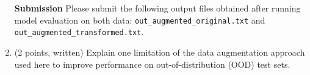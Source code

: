\documentclass{article}
\theoremstyle{case}
\theoremstyle{definition}
\begin{document}
\begin{enumerate}
    \textbf{Submission} Please submit the following output files obtained after running model evaluation on both data: \texttt{out\_augmented\_original.txt} and  \texttt{out\_augmented\_transformed.txt}.



    \newpage
    \item (2 points, written) Explain one limitation of the data augmentation approach used here to improve performance on out-of-distribution (OOD) test sets.




\end{enumerate}
\end{document}
